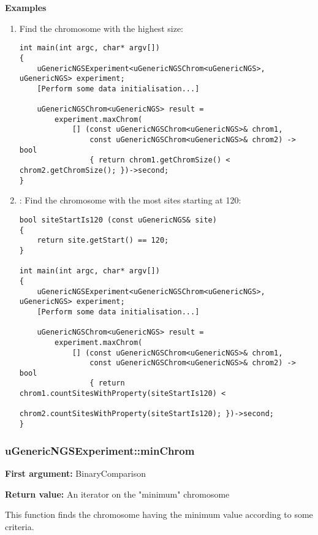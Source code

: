\documentclass[letterpaper,10pt]{article}
\begin{document}
\bigskip
\noindent{}\textbf{Examples}
\begin{enumerate}
 \item Find the chromosome with the highest size:
\begin{verbatim}
int main(int argc, char* argv[])
{
    uGenericNGSExperiment<uGenericNGSChrom<uGenericNGS>, uGenericNGS> experiment;
    [Perform some data initialisation...]

    uGenericNGSChrom<uGenericNGS> result = 
        experiment.maxChrom(
            [] (const uGenericNGSChrom<uGenericNGS>& chrom1, 
                const uGenericNGSChrom<uGenericNGS>& chrom2) -> bool
                { return chrom1.getChromSize() < chrom2.getChromSize(); })->second;
}
\end{verbatim}

 \item : Find the chromosome with the most sites starting at 120:
\begin{verbatim}
bool siteStartIs120 (const uGenericNGS& site)
{
    return site.getStart() == 120;
}

int main(int argc, char* argv[])
{
    uGenericNGSExperiment<uGenericNGSChrom<uGenericNGS>, uGenericNGS> experiment;
    [Perform some data initialisation...]

    uGenericNGSChrom<uGenericNGS> result = 
        experiment.maxChrom(
            [] (const uGenericNGSChrom<uGenericNGS>& chrom1, 
                const uGenericNGSChrom<uGenericNGS>& chrom2) -> bool
                { return chrom1.countSitesWithProperty(siteStartIs120) < 
                         chrom2.countSitesWithProperty(siteStartIs120); })->second;
}
\end{verbatim}
\end{enumerate}

\subsubsection{uGenericNGSExperiment::minChrom}
\textbf{First argument:} BinaryComparison

\noindent{}\textbf{Return value:} An iterator on the "minimum" chromosome

\bigskip
\noindent{}This function finds the chromosome having the minimum value according to some criteria.
\end{document}

